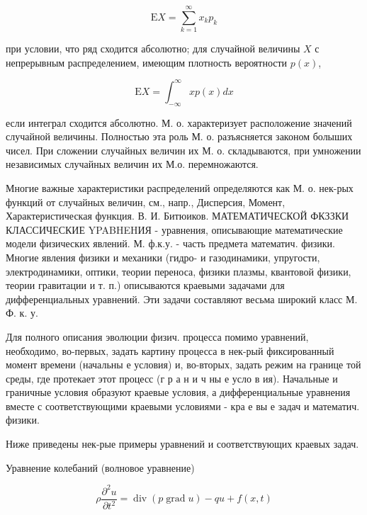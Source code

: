 \documentclass[10pt]{article}
\begin{document}
\[

\mathrm{E} X=\sum_{k=1}^{\infty} x_{k} p_{k}

\]



при условии, что ряд сходится абсолютно; для случайной величины $X$ с непрерывным распределением, имеющим плотность вероятности $p(x)$,



\[

\mathrm{E} X=\int_{-\infty}^{\infty} x p(x) d x

\]



если интеграл сходится абсолютно. М. о. характеризует расположение значений случайной величины. Полностью эта роль М. о. разъясняется законом болыших чисел. При сложении случайных величин их М. о. складываются, при умножении независимых случайных величин их М.о. перемножаются.



Многие важные характеристики распределений определяются как М. о. нек-рых функций от случайных величин, см., напр., Дисперсия, Момент, Характеристическая функция. В. И. Битюиков. МАТЕМАТИЧЕСКОЙ ФКЗЗКИ КЛАССИЧЕСКИЕ YPABHEHИЯ - уравнения, описывающие математические модели физических явлений. М. ф.к.у. - часть предмета математич. физики. Многие явления физики и механики (гидро- и газодинамики, упругости, электродинамики, оптики, теории переноса, физики плазмы, квантовой физики, теории гравитации и т. п.) описываются краевыми задачами для дифференциальных уравнений. Эти задачи составляют весьма широкий класс М. Ф. к. у.



Для полного описания эволюции физич. процесса помимо уравнений, необходимо, во-первых, задать картину процесса в нек-рый фиксированный момент времени (начальны е условия) и, во-вторых, задать режим на границе той среды, где протекает этот процесс (г р а н и ч ны е усло в ия). Начальные и граничные условия образуют краевые условия, а дифференциальные уравнения вместе с соответствующими краевыми условиями - кра е вы е задач и математич. физики.



Ниже приведены нек-рые примеры уравнений и соответствующих краевых задач.



Уравнение колебаний (волновое уравнение)



\[

\rho \frac{\partial^{2} u}{\partial t^{2}}=\operatorname{div}(p \operatorname{grad} u)-q u+f(x, t)

\]
\end{document}
